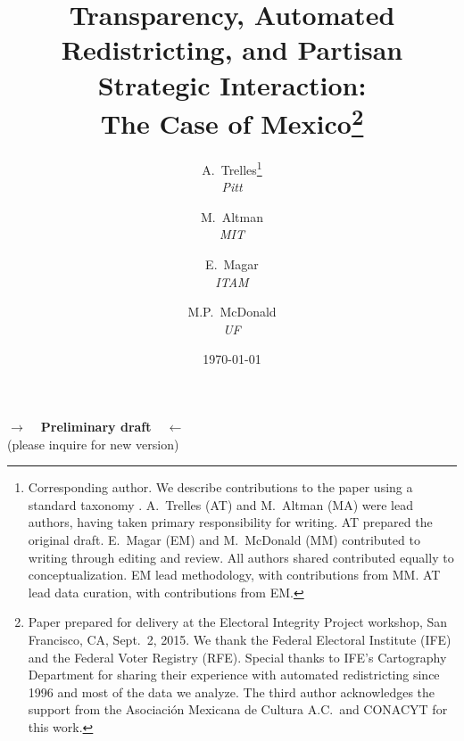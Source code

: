 \documentclass[letter,12pt]{article}
\begin{document}
\title{Transparency, Automated Redistricting, and Partisan Strategic Interaction: \\ 
       The Case of Mexico\thanks{Paper prepared for delivery at the Electoral Integrity Project workshop, San Francisco, CA, Sept.~2, 2015. We thank the Federal Electoral Institute (IFE) and the Federal Voter Registry (RFE). Special thanks to IFE's Cartography Department for sharing their experience with automated redistricting since 1996 and most of the data we analyze. The third author acknowledges the support from the Asociaci\'on Mexicana de Cultura A.C.\ and CONACYT for this work.}}

\author {A.~Trelles\footnote{Corresponding author. We describe contributions to the paper using a standard taxonomy \citep{allen2014credit}. A.~Trelles (AT) and M.~Altman (MA) were lead authors, having taken primary responsibility for writing.  AT prepared the original draft.  E.~Magar (EM) and M.~McDonald (MM) contributed to writing through editing and review. All authors shared contributed equally to conceptualization. EM lead methodology, with contributions from MM. AT lead data curation, with contributions from EM.} \\ \emph{Pitt} \and
        M.~Altman  \\ \emph{MIT} \and
        E.~Magar  \\  \emph{ITAM} \and
        M.P.~McDonald \\ \emph{UF}
      }
      

\date{\today}
\maketitle


\begin{center} \textbf{$\rightarrow$~~Preliminary draft~~$\leftarrow$} \\ (please inquire for new version) \end{center}
\end{document}
